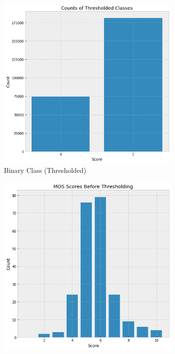 \begin{figure}[ht]
    \centering
    \begin{subfigure}[b]{0.25\textwidth}
    \includegraphics[height=\textwidth]{figures/research_methadology/imballance.png}
    \caption{Binary Class (Thresholded)}
    \label{fig:imbalance}
    \end{subfigure}
    \hspace{5mm}
    \begin{subfigure}[b]{0.25\textwidth}
    \includegraphics[height=\textwidth]{figures/research_methadology/mos counts.png}

\end{subfigure}
\end{figure}
